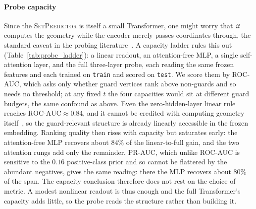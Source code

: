 \documentclass[11pt]{article}
\newcommand{\OPT}{\mathrm{OPT}}
\newcommand{\SetPredictor}{\textup{\textsc{SetPredictor}}}
\begin{document}
\begin{table}[!ht]
  \centering
  \footnotesize
  \caption{Encoder--seed ablation at \emph{matched guard budget} on \texttt{test} ($362$ polygons); Table~\ref{tab:ablation} shows the same four conditions at a fixed threshold. Entries are means over four probe seeds. $\#$fail is the number of polygons below the $0.99$ gate under exact CGAL; its $\pm$ std is shown, that of $|S|/\OPT$ omitted for width (at most $0.28$, usually under $0.10$). \emph{(a) Swept curves:} a common $t$ buys each condition a different number of guards, so rows cannot be read across conditions, hence panel (b). \emph{(b) Matched budget:} each seed is interpolated to a common $|S|/\OPT$ along its own curve and the four are then averaged. Because (a) instead averages at a fixed $t$, where the seeds sit at different costs, the same condition can show a different count at what looks like the same budget; (b) is the form the matched-budget claim rests on. Values in (b) are read between swept thresholds, so the narrow gaps between adjacent conditions at the extreme budgets depend on that reading in a way the full-versus-no-encoder gap does not.}
  \label{tab:ablation_thresholds}
\end{table}

\paragraph{Probe capacity} Since the \SetPredictor{} is itself a small Transformer, one might worry that \emph{it} computes the geometry while the encoder merely passes coordinates through, the standard caveat in the probing literature~\cite{HewittLiang2019Probes,Zhang2025ProbingNCO}. A capacity ladder rules this out (Table~\ref{tab:probe_ladder}): a linear readout, an attention-free MLP, a single self-attention layer, and the full three-layer probe, each reading the same frozen features and each trained on \texttt{train} and scored on \texttt{test}. We score them by ROC-AUC, which asks only whether guard vertices rank above non-guards and so needs no threshold; at any fixed $t$ the four capacities would sit at different guard budgets, the same confound as above. Even the zero-hidden-layer linear rule reaches $\mathrm{ROC\text{-}AUC} \approx 0.84$, and it cannot be credited with computing geometry itself~\cite{AlainBengio2017Probes}, so the guard-relevant structure is already linearly accessible in the frozen embedding. Ranking quality then rises with capacity but saturates early: the attention-free MLP recovers about $84\%$ of the linear-to-full gain, and the two attention rungs add only the remainder. PR-AUC, which unlike ROC-AUC is sensitive to the $0.16$ positive-class prior and so cannot be flattered by the abundant negatives, gives the same reading: there the MLP recovers about $80\%$ of the span. The capacity conclusion therefore does not rest on the choice of metric. A modest nonlinear readout is thus enough and the full Transformer's capacity adds little, so the probe reads the structure rather than building it.
\end{document}
